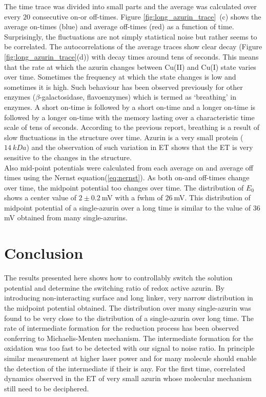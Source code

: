 \documentclass[journal=jacsat,manuscript=article]{achemso}
\begin{document}
The time trace was divided into small parts and the average was calculated over every $20$ consecutive on-or off-times. Figure \ref{fig:long_azurin_trace}~(c) shows the average on-times (blue) and average off-times (red) as a function of time. Surprisingly, the fluctuations are not simply statistical noise but rather seems to be correlated. The autocorrelations of the average traces show clear decay (Figure \ref{fig:long_azurin_trace}(d)) with decay times around tens of seconds. This means that the rate at which the azurin changes between Cu(II) and Cu(I) state varies over time. Sometimes the frequency at which the state changes is low and sometimes it is high. Such behaviour has been observed previously for other enzymes ($\beta$-galactosidase, flavoenzymes)\cite{lu1998single-molecule,kou2005single-molecule,english2006ever-fluctuating} which is termed as `breathing' in enzymes. A short on-time is followed by a short on-time and a longer on-time is followed by a longer on-time with the memory lasting over a characteristic time scale of tens of seconds. According to the previous report, breathing is a result of slow fluctuations in the structure over time. Azurin is a very small protein ($14~kDa$) and the observation of such variation in ET shows that the ET is very sensitive to the changes in the structure.\\

Also mid-point potentials were calculated from each average on and average off times using the Nernst equation(\ref{eq:nernst}). As both on-and off-times change over time, the midpoint potential too changes over time. The distribution of $E_0$ shows a center value of $2\pm0.2~$mV with a fwhm of $26~$mV. This distribution of midpoint potential of a single-azurin over a long time is similar to the value of $36~$mV obtained from many single-azurins.
\section{Conclusion}
The results presented here shows how to controllably switch the solution potential and determine the switching ratio of redox active azurin. By introducing non-interacting surface and long linker, very narrow distribution in the midpoint potential obtained. The distribution over many single-azurin was found to be very close to the distribution of a single-azurin over long time. The rate of intermediate formation for the reduction process has been observed conferring to Michaelis-Menten mechanism. The intermediate formation for the oxidation was too fast to be detected with our signal to noise ratio. In principle similar measurement at higher laser power and for many molecule should enable the detection of the intermediate if their is any. For the first time, correlated dynamics observed in the ET of very small azurin whose molecular mechanism still need to be deciphered.
% 
\pagebreak

\end{document}
